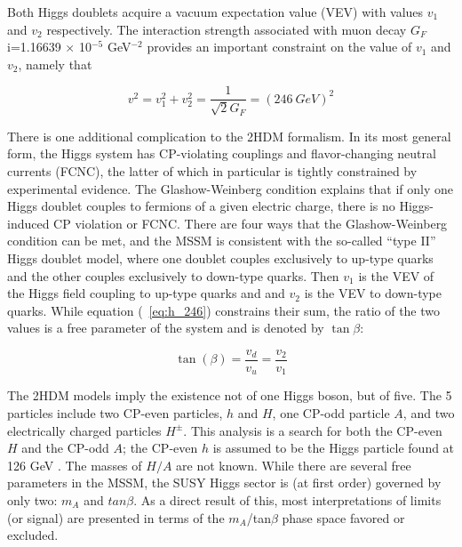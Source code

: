 

Both Higgs doublets acquire a vacuum expectation value (VEV) with values $v_1$ 
and $v_2$ respectively.  The interaction strength associated with
muon decay $G_F$i=1.16639 $\times$ 10$^{-5}$ GeV$^{-2}$ 
provides an important constraint on the value of $v_1$ and $v_2$, namely that 

\begin{equation}
	v^2 = v_1^2 + v_2^2 = \frac{1}{\sqrt{2}G_F} = (246\ GeV)^2
	\label{eq:h_246}
\end{equation}


There is one additional complication to the 2HDM formalism.  In its most general form, 
the Higgs system has CP-violating couplings and flavor-changing neutral currents 
(FCNC), the latter of which in particular is tightly constrained by experimental evidence.  
The Glashow-Weinberg condition explains that if only one Higgs doublet couples to fermions 
of a given electric charge, there is no Higgs-induced CP violation or 
FCNC.  There are four ways that the Glashow-Weinberg condition can be met, 
and the MSSM is consistent with the so-called ``type II'' Higgs 
doublet model, where one doublet couples exclusively to up-type quarks and the 
other couples exclusively to down-type quarks.  Then $v_1$ 
is the VEV of the Higgs field coupling to up-type quarks and and $v_2$ 
is the VEV to down-type quarks.  While equation (~\ref{eq:h_246}) 
constrains their sum, the ratio of the two values is a free parameter of 
the system and is denoted by $\tan\beta$:

\begin{equation}
	\tan(\beta) = \frac{v_d}{v_u} = \frac{v_2}{v_1}
\end{equation}




The 2HDM models imply the existence not of one Higgs boson, but of five.  
The 5 particles include two CP-even particles, $h$ and $H$, 
one CP-odd particle $A$, and two electrically charged particles $H^\pm$.   
This analysis is a search for both the CP-even $H$ and 
the CP-odd $A$; the CP-even $h$ is 
assumed to be the Higgs particle found at 126 GeV \cite{PDG-Review}.  
The masses of $H/A$ are not known.  While there are several free parameters in the MSSM, the SUSY Higgs sector is 
(at first order) governed by only two: $m_A$ 
and $tan\beta$.  As a direct result of this, most interpretations 
of limits (or signal) are presented in terms of the $m_A$/tan$\beta$ phase space favored or excluded.  




